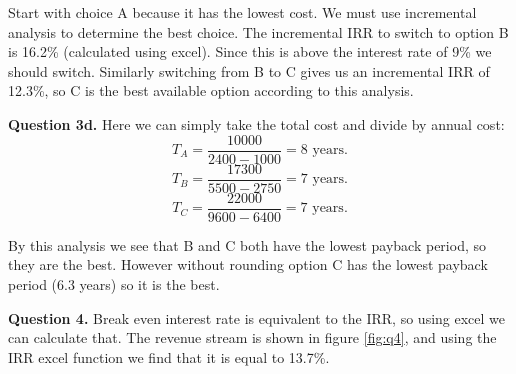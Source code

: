 \documentclass[letterpaper, reqno,11pt]{article}
\begin{document}
Start with choice A because it has the lowest cost. We must use incremental analysis to determine the best choice. The incremental IRR to switch to option B is 16.2\% (calculated using excel). Since this is above the interest rate of 9\% we should switch. Similarly switching from B to C gives us an incremental IRR of 12.3\%, so C is the best available option according to this analysis. 

{\noindent\bf Question 3d.} Here we can simply take the total cost and divide by annual cost: 
\[
T_A=\frac{10000}{2400-1000}=8\text{ years}
.\]
\[
T_B=\frac{17300}{5500-2750}=7\text{ years}
.\]
\[
T_C=\frac{22000}{9600-6400}=7\text{ years}
.\]

By this analysis we see that B and C both have the lowest payback period, so they are the best. However without rounding option C has the lowest payback period (6.3 years) so it is the best. 

{\noindent\bf Question 4.} Break even interest rate is equivalent to the IRR, so using excel we can calculate that. The revenue stream is shown in figure \ref{fig:q4}, and using the IRR excel function we find that it is equal to 13.7\%. 
\end{document}
